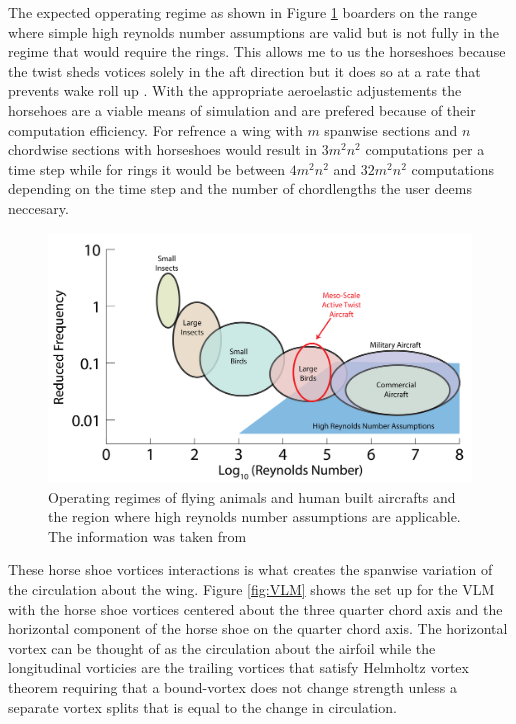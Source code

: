 \documentclass[11pt]{ucthesis}
\begin{document}
The expected opperating regime as shown in Figure \ref{fig:reynolds} boarders on the range where simple high reynolds number assumptions are valid but is not fully in the regime that would require the rings. This allows me to us the horseshoes because the twist sheds votices solely in the aft direction but it does so at a rate that prevents wake roll up \cite{koochesfahani1989vortical}. With the appropriate aeroelastic adjustements the horsehoes are a viable means of simulation and are prefered because of their computation efficiency. For refrence a wing with $m$ spanwise sections and $n$ chordwise sections with horseshoes would result in $3m^2n^2$ computations per a time step while for rings it would be between $4m^2n^2$ and $32m^2n^2$ computations depending on the time step and the number of chordlengths the user deems neccesary. 

\begin{figure}[h]
\centering
\includegraphics[width=1\linewidth]{Figures/ReducedFrequencyvReynoldsTypes-01.png}
\caption{Operating regimes of flying animals and human built aircrafts and the region where high reynolds number assumptions are applicable. The information was taken from \cite{mueller2001fixed}}
\label{fig:reynolds}
\end{figure}

These horse shoe vortices interactions is what creates the spanwise variation of the circulation about the wing. Figure \ref{fig:VLM} shows the set up for the VLM with the horse shoe vortices centered about the three quarter chord axis and the horizontal component of the horse shoe on the quarter chord axis. The horizontal vortex can be thought of as the circulation about the airfoil while the longitudinal vorticies are the trailing vortices that satisfy Helmholtz vortex theorem requiring that a bound-vortex does not change strength unless a separate vortex splits that is equal to the change in circulation. 
\end{document}
